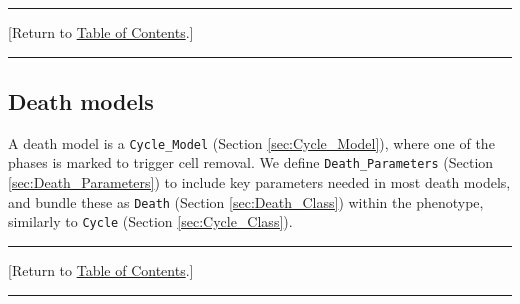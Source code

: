 \documentclass[12pt]{article}
\renewcommand{\v}{\verb}
\newcommand{\blue}[1]{\textcolor{blue}{#1}}
\newcommand{\DONE}{}%
\newcommand{\TOClink}{\begin{center}\hrule\vskip-5pt\phantom{.}\hfill[Return to \hyperlink{TOC}{Table of Contents}.]\hfill\phantom{.}\vskip3pt\hrule\end{center}}
\begin{document}







\TOClink 

\subsection{Death models \DONE}
\label{sec:Death}
A death model is a \v|Cycle_Model| (Section \ref{sec:Cycle_Model}), where one of the phases is marked to trigger 
cell removal. We define \v|Death_Parameters| (Section \ref{sec:Death_Parameters}) to include key parameters 
needed in most death models, and bundle these as \v|Death| (Section \ref{sec:Death_Class}) 
within the phenotype, similarly to \v|Cycle| (Section \ref{sec:Cycle_Class}). 

\TOClink 
\end{document}
